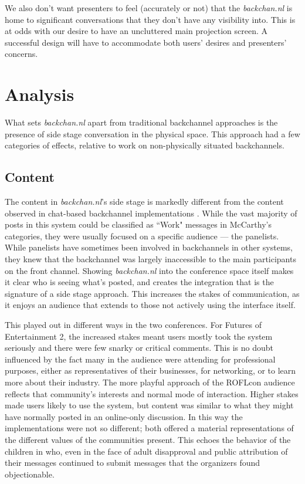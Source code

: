 We also don't want presenters to feel (accurately or not) that the \emph{backchan.nl} is home to significant conversations that they don't have any visibility into. This is at odds with our desire to have an uncluttered main projection screen. A successful design will have to accommodate both users' desires and presenters' concerns.

\section{Analysis}

What sets \emph{backchan.nl} apart from traditional backchannel approaches is the presence of side stage conversation in the physical space. This approach had a few categories of effects, relative to work on non-physically situated backchannels.

\subsection{Content}
The content in \emph{backchan.nl}'s side stage is markedly different from the content observed in chat-based backchannel implementations \citep{Yardi:2006uk,Cogdill:2001fp,Golub:2005ws,Rekimoto:1998jy}. While the vast majority of posts in this system could be classified as ``Work" messages in McCarthy's categories, they were usually focused on a specific audience — the panelists. While panelists have sometimes been involved in backchannels in other systems, they knew that the backchannel was largely inaccessible to the main participants on the front channel. Showing \emph{backchan.nl} into the conference space itself makes it clear who is seeing what's posted, and creates the integration that is the signature of a side stage approach. This increases the stakes of communication, as it enjoys an audience that extends to those not actively using the interface itself.

This played out in different ways in the two conferences. For Futures of Entertainment 2, the increased stakes meant users mostly took the system seriously and there were few snarky or critical comments. This is no doubt influenced by the fact many in the audience were attending for professional purposes, either as representatives of their businesses, for networking, or to learn more about their industry. The more playful approach of the ROFLcon audience reflects that community's interests and normal mode of interaction. Higher stakes made users likely to use the system, but content was similar to what they might have normally posted in an online-only discussion. In this way the implementations were not so different; both offered a material representations of the different values of the communities present. This echoes the behavior of the children in \citep{Chesnais:uh} who, even in the face of adult disapproval and public attribution of their messages continued to submit messages that the organizers found objectionable. 

